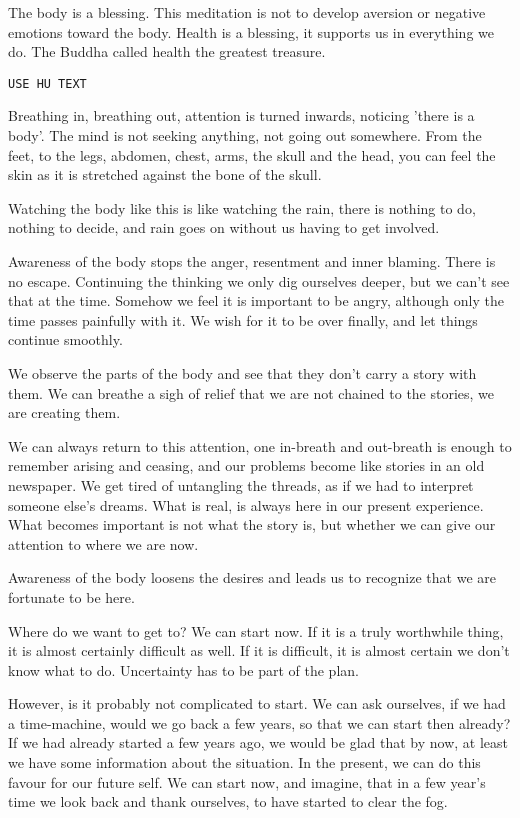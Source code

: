 The body is a blessing. This meditation is not to develop aversion or
negative emotions toward the body. Health is a blessing, it supports us
in everything we do. The Buddha called health the greatest treasure.

\begin{verbatim}
USE HU TEXT
\end{verbatim}

Breathing in, breathing out, attention is turned inwards, noticing
'there is a body'. The mind is not seeking anything, not going out
somewhere. From the feet, to the legs, abdomen, chest, arms, the skull
and the head, you can feel the skin as it is stretched against the bone
of the skull.

Watching the body like this is like watching the rain, there is nothing
to do, nothing to decide, and rain goes on without us having to get
involved.

Awareness of the body stops the anger, resentment and inner blaming.
There is no escape. Continuing the thinking we only dig ourselves
deeper, but we can't see that at the time. Somehow we feel it is
important to be angry, although only the time passes painfully with it.
We wish for it to be over finally, and let things continue smoothly.

We observe the parts of the body and see that they don't carry a story
with them. We can breathe a sigh of relief that we are not chained to
the stories, we are creating them.

We can always return to this attention, one in-breath and out-breath is
enough to remember arising and ceasing, and our problems become like
stories in an old newspaper. We get tired of untangling the threads, as
if we had to interpret someone else's dreams. What is real, is always
here in our present experience. What becomes important is not what the
story is, but whether we can give our attention to where we are now.

Awareness of the body loosens the desires and leads us to recognize that
we are fortunate to be here.

Where do we want to get to? We can start now. If it is a truly
worthwhile thing, it is almost certainly difficult as well. If it is
difficult, it is almost certain we don't know what to do. Uncertainty
has to be part of the plan.

However, is it probably not complicated to start. We can ask ourselves,
if we had a time-machine, would we go back a few years, so that we can
start then already? If we had already started a few years ago, we would
be glad that by now, at least we have some information about the
situation. In the present, we can do this favour for our future self. We
can start now, and imagine, that in a few year's time we look back and
thank ourselves, to have started to clear the fog.

